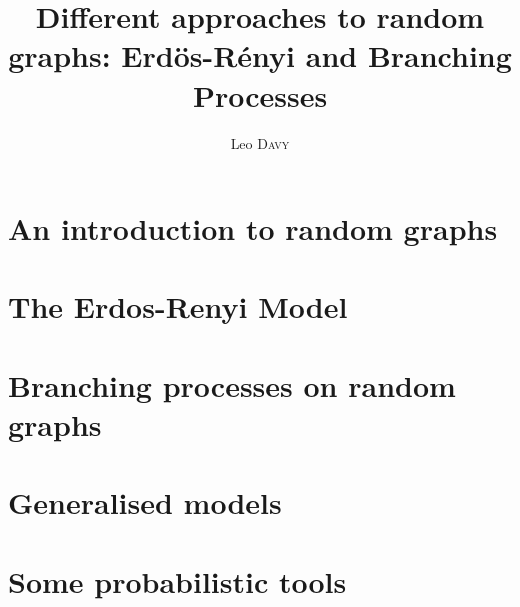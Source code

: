 \documentclass{report}
\title{Different approaches to random graphs: Erd\"os-R\'enyi and Branching Processes}
\author{Leo \textsc{Davy} }
\date{}
\theoremstyle{definition}
\begin{document}
\maketitle

\tableofcontents{}

\chapter{An introduction to random graphs}


\chapter{The Erdos-Renyi Model}


\chapter{Branching processes on random graphs}


\chapter{Generalised models}


\appendix

\chapter{Some probabilistic tools}


\printbibliography[heading = bibintoc, title={References}]
\end{document}
